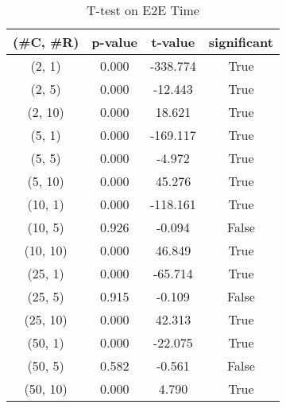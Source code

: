 \begin{table}[h]
\centering
\caption{T-test on E2E Time}
\label{tab:t-testExperiment}
\begin{tabular}{|c|c|c|c|}
\toprule
(\#C, \#R) &  p-value &  t-value &  significant \\
\midrule
  (2, 1) &    0.000 & -338.774 &         True \\
  (2, 5) &    0.000 &  -12.443 &         True \\
 (2, 10) &    0.000 &   18.621 &         True \\
  (5, 1) &    0.000 & -169.117 &         True \\
  (5, 5) &    0.000 &   -4.972 &         True \\
 (5, 10) &    0.000 &   45.276 &         True \\
 (10, 1) &    0.000 & -118.161 &         True \\
 (10, 5) &    0.926 &   -0.094 &        False \\
(10, 10) &    0.000 &   46.849 &         True \\
 (25, 1) &    0.000 &  -65.714 &         True \\
 (25, 5) &    0.915 &   -0.109 &        False \\
(25, 10) &    0.000 &   42.313 &         True \\
 (50, 1) &    0.000 &  -22.075 &         True \\
 (50, 5) &    0.582 &   -0.561 &        False \\
(50, 10) &    0.000 &    4.790 &         True \\
\bottomrule
\end{tabular}
\end{table}
